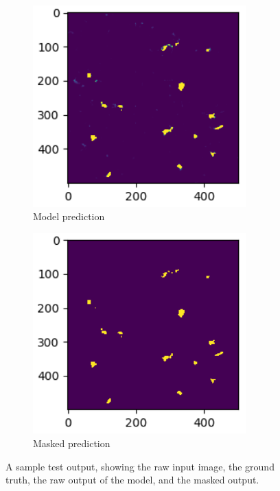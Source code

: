 \documentclass{article}
\begin{document}
\begin{figure}[ht]
  \begin{subfigure}{0.24\textwidth}
    \includegraphics[width=0.9\textwidth]{test-sample-pred.png}
    \centering
    \caption{Model prediction}
  \end{subfigure}%
  \begin{subfigure}{0.24\textwidth}
    \includegraphics[width=0.9\textwidth]{test-sample-masked.png}
    \centering
    \caption{Masked prediction}
  \end{subfigure}
  \captionsetup{width=0.9\textwidth}
  \caption{A sample test output, showing the raw input image, the ground truth,
  the raw output of the model, and the masked output.}
  \label{fig:test-sample}
\end{figure}
\end{document}
